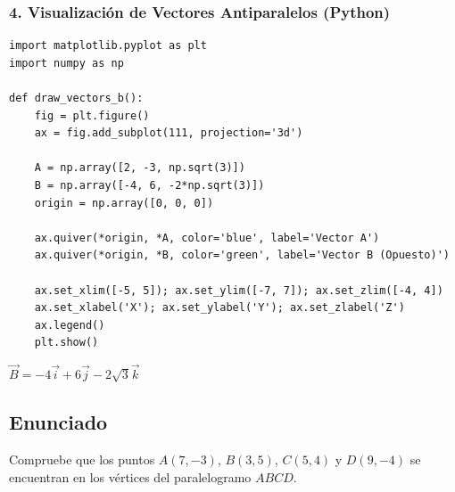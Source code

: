 \documentclass[12pt, a4paper]{article}
\begin{document}
\subsubsection*{4. Visualización de Vectores Antiparalelos (Python)}
\begin{lstlisting}
import matplotlib.pyplot as plt
import numpy as np

def draw_vectors_b():
    fig = plt.figure()
    ax = fig.add_subplot(111, projection='3d')
    
    A = np.array([2, -3, np.sqrt(3)])
    B = np.array([-4, 6, -2*np.sqrt(3)])
    origin = np.array([0, 0, 0])
    
    ax.quiver(*origin, *A, color='blue', label='Vector A')
    ax.quiver(*origin, *B, color='green', label='Vector B (Opuesto)')
    
    ax.set_xlim([-5, 5]); ax.set_ylim([-7, 7]); ax.set_zlim([-4, 4])
    ax.set_xlabel('X'); ax.set_ylabel('Y'); ax.set_zlabel('Z')
    ax.legend()
    plt.show()
\end{lstlisting}

\begin{tcolorbox}[colback=green!5!white, colframe=green!50!black, title=Respuesta Final]
\centering \Large $\vec{B} = -4\vec{i} + 6\vec{j} - 2\sqrt{3}\vec{k}$
\end{tcolorbox}

\newpage

\subsection*{Enunciado}
Compruebe que los puntos $A(7, -3)$, $B(3, 5)$, $C(5, 4)$ y $D(9, -4)$ se encuentran en los vértices del paralelogramo $ABCD$.
\end{document}
